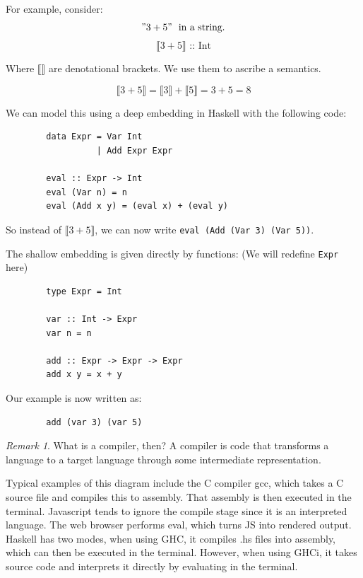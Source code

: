 \documentclass[a4paper,12pt]{article}
\theoremstyle{remark}
\newtheorem*{remark}{Remark}
\begin{document}
  For example, consider:
  \["3+5" \textrm{\ \ in a string.}\]
  \[ \llbracket 3+5\rrbracket \textrm{ \ :: \ Int} \]

  Where $\llbracket \rrbracket$ are denotational brackets. We use them to ascribe a semantics.

  \[ \llbracket 3+5\rrbracket = \llbracket 3\rrbracket + \llbracket 5 \rrbracket = 3+5 = 8 \]

  We can model this using a deep embedding in Haskell with the following code:

  \begin{lstlisting}
        data Expr = Var Int
                  | Add Expr Expr

        eval :: Expr -> Int
        eval (Var n) = n
        eval (Add x y) = (eval x) + (eval y)  \end{lstlisting}

  So instead of $\llbracket 3 + 5 \rrbracket$, we can now write
  \lstinline{eval (Add (Var 3) (Var 5))}.

  The shallow embedding is given directly by functions: (We will redefine
  \lstinline{Expr} here)

  \begin{lstlisting}
        type Expr = Int

        var :: Int -> Expr
        var n = n

        add :: Expr -> Expr -> Expr
        add x y = x + y  \end{lstlisting}

  Our example is now written as:

  \begin{lstlisting}
        add (var 3) (var 5)  \end{lstlisting}

\begin{remark}
  What is a compiler, then? A compiler is code that transforms a language to a
  target language through some intermediate representation.

  \begin{figure}[H]
    \centering
  \end{figure}

  Typical examples of this diagram include the C compiler gcc, which takes a C
  source file and compiles this to assembly. That assembly is then executed in
  the terminal. Javascript tends to ignore the compile stage since it is an interpreted
  language. The web browser performs eval, which turns JS into rendered output.
  Haskell has two modes, when using GHC, it compiles .hs files into assembly,
  which can then be executed in the terminal. However, when using GHCi, it takes
  source code and interprets it directly by evaluating in the terminal.

\end{remark}
\end{document}
